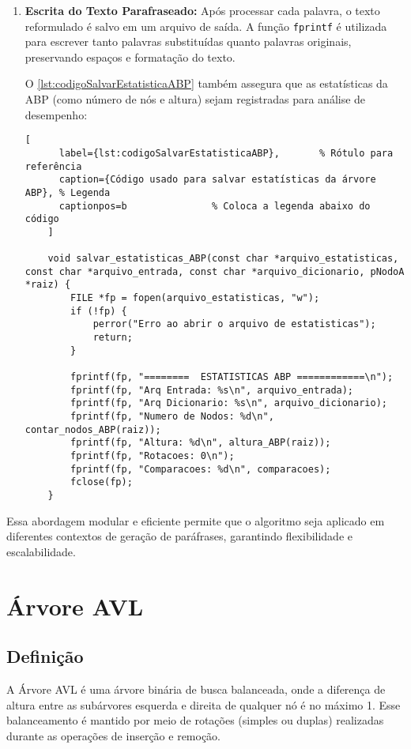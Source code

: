 \documentclass[a4paper, 12pt, english]{article}
\begin{document}
\begin{enumerate}
\begin{lstlisting}
\end{lstlisting}

\newpage
    \item \textbf{Escrita do Texto Parafraseado:}
    Após processar cada palavra, o texto reformulado é salvo em um arquivo de saída. A função \texttt{fprintf} é utilizada para escrever tanto palavras substituídas quanto palavras originais, preservando espaços e formatação do texto.

    O \autoref{lst:codigoSalvarEstatisticaABP} também assegura que as estatísticas da ABP (como número de nós e altura) sejam registradas para análise de desempenho:
    \begin{lstlisting}[
      label={lst:codigoSalvarEstatisticaABP},       % Rótulo para referência
      caption={Código usado para salvar estatísticas da árvore ABP}, % Legenda
      captionpos=b               % Coloca a legenda abaixo do código
    ]

    void salvar_estatisticas_ABP(const char *arquivo_estatisticas, const char *arquivo_entrada, const char *arquivo_dicionario, pNodoA *raiz) {
        FILE *fp = fopen(arquivo_estatisticas, "w");
        if (!fp) {
            perror("Erro ao abrir o arquivo de estatisticas");
            return;
        }
    
        fprintf(fp, "========  ESTATISTICAS ABP ============\n");
        fprintf(fp, "Arq Entrada: %s\n", arquivo_entrada);
        fprintf(fp, "Arq Dicionario: %s\n", arquivo_dicionario);
        fprintf(fp, "Numero de Nodos: %d\n", contar_nodos_ABP(raiz));
        fprintf(fp, "Altura: %d\n", altura_ABP(raiz));
        fprintf(fp, "Rotacoes: 0\n");
        fprintf(fp, "Comparacoes: %d\n", comparacoes);
        fclose(fp);
    }
\end{lstlisting}
\end{enumerate}

Essa abordagem modular e eficiente permite que o algoritmo seja aplicado em diferentes contextos de geração de paráfrases, garantindo flexibilidade e escalabilidade. 
\newpage

\newpage

\section{Árvore AVL}
\subsection{Definição}
A Árvore AVL é uma árvore binária de busca balanceada, onde a diferença de altura entre as subárvores esquerda e direita de qualquer nó é no máximo 1. Esse balanceamento é mantido por meio de rotações (simples ou duplas) realizadas durante as operações de inserção e remoção.
\end{document}
